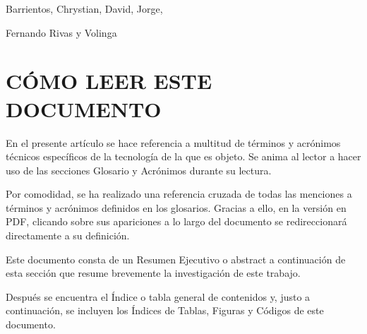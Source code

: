 \documentclass[a4paper, 12pt, spanish, twoside]{article}
\newcommand\blankpage{%
    \null
    \thispagestyle{empty}%
    \newpage}
\begin{document}
Barrientos,
Chrystian,
David,
Jorge,

Fernando Rivas y Volinga

\clearpage
\afterpage{\blankpage} %





\section*{CÓMO LEER ESTE DOCUMENTO} %

En el presente artículo se hace referencia a multitud de términos y acrónimos técnicos específicos de la tecnología de la que es objeto. Se anima al lector a hacer uso de las secciones Glosario y Acrónimos durante su lectura.

Por comodidad, se ha realizado una referencia cruzada de todas las menciones a términos y acrónimos definidos en los glosarios. Gracias a ello, en la versión en PDF, clicando sobre sus apariciones a lo largo del documento se redireccionará directamente a su definición. 

Este documento consta de un Resumen Ejecutivo o abstract a continuación de esta sección que resume brevemente la investigación de este trabajo. 

Después se encuentra el Índice o tabla general de contenidos y, justo a continuación, se incluyen los Índices de Tablas, Figuras y Códigos de este documento. 
\end{document}
